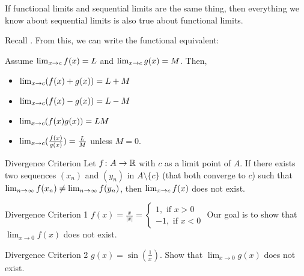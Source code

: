If functional limits and sequential limits are the same thing, then everything we know about sequential limits is also true about functional limits.

Recall . From this, we can write the functional equivalent:

Assume \(\lim_{x \rightarrow c}f(x) = L\) and \(\lim_{x \rightarrow c}g(x) = M\). Then,
\begin{itemize}
    \item \(\lim_{x \rightarrow c}(f(x) + g(x)) = L + M\)
    \item \(\lim_{x \rightarrow c}(f(x) - g(x)) = L - M\)
    \item \(\lim_{x \rightarrow c}(f(x)g(x)) = LM\)
    \item \(\lim_{x \rightarrow c}(\frac{f(x)}{g(x)}) = \frac{L}{M}\) unless \(M = 0\).
\end{itemize}

\begin{ntheorem}
    {Divergence Criterion} Let \(f \colon A \rightarrow \mathbb{R}\) with \(c\) as a limit point of \(A\). If there exists two sequences \((x_n)\) and \((y_n)\) in \(A \setminus \{c\}\) (that both converge to \(c\)) such that \(\lim_{n \rightarrow \infty} f(x_n) \ne \lim_{n \rightarrow \infty} f(y_n)\), then \(\lim_{x \rightarrow c}f(x)\) does not exist.
\end{ntheorem}

\begin{example}
    {Divergence Criterion 1} \(f(x) = \frac{x}{|x|} = \begin{cases}
        1, \text{ if } x > 0 \\
        -1, \text{ if } x < 0
    \end{cases}\)
    Our goal is to show that \(\lim_{x \rightarrow 0} f(x)\) does not exist.
\end{example}


\begin{example}
    {Divergence Criterion 2} \(g(x) = \sin(\frac{1}{x})\). Show that \(\lim_{x \rightarrow 0} g(x)\) does not exist.
\end{example}




